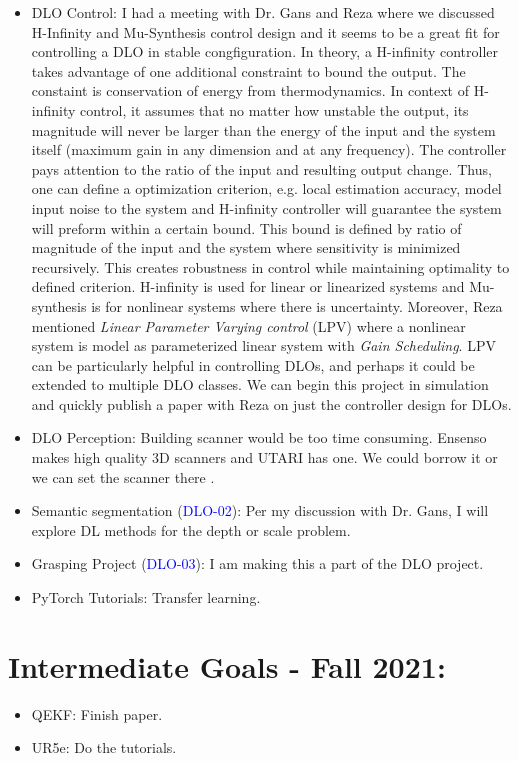 \documentclass[11pt]{article}
\begin{document}
\begin{itemize}
    \item DLO Control: I had a meeting with Dr. Gans and Reza
    where we discussed H-Infinity and Mu-Synthesis control design and it seems
    to be a great fit for controlling a DLO in stable congfiguration. In theory,
    a H-infinity controller takes advantage of one additional constraint to bound
    the output. The constaint is conservation of energy from thermodynamics.
    In context of H-infinity control, it assumes that no matter how unstable the
    output, its magnitude will never be larger than the energy of the input and
    the system itself (maximum gain in any dimension and at any frequency). The controller pays attention
    to the ratio of the input and resulting output change. Thus,
    one can define a optimization criterion, e.g. local estimation accuracy,
    model input noise to the system and H-infinity controller will guarantee
    the system will preform within a certain bound. This bound is defined by
    ratio of magnitude of the input and the system where sensitivity is minimized
    recursively. This creates robustness in control while maintaining optimality
    to defined criterion. H-infinity is used for linear or linearized systems and
    Mu-synthesis is for nonlinear systems where there is uncertainty. Moreover,
    Reza mentioned \emph{Linear Parameter Varying control} (LPV) where a nonlinear
    system is model as parameterized linear system with \emph{Gain Scheduling}.
    LPV can be particularly helpful in controlling DLOs, and perhaps it could
    be extended to multiple DLO classes. We can begin this project in simulation
    and quickly publish a paper with Reza on just the controller design for DLOs.

    \item DLO Perception: Building scanner would be too time consuming. Ensenso
    makes high quality 3D scanners and UTARI has one. We could borrow it or we can
    set the scanner there \cite{3DCamera52:online}.

    \item Semantic segmentation (\textcolor{blue}{DLO-02}): Per my discussion with Dr. Gans, I will explore DL methods for the depth or scale problem.
    \item Grasping Project (\textcolor{blue}{DLO-03}): I am making this a part of the DLO project.
    \item PyTorch Tutorials: Transfer learning.

  \end{itemize}

\section{Intermediate Goals - Fall 2021:}
\begin{itemize}
      \item QEKF: Finish paper.
      \item UR5e: Do the tutorials.
\end{itemize}

\newpage

\newpage


\end{document}
